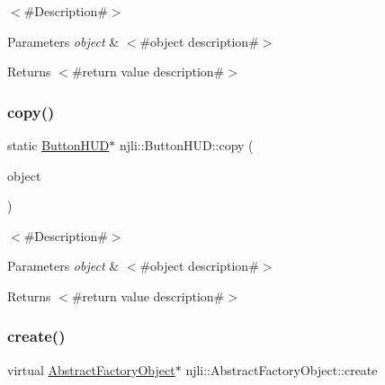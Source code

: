 $<$\#\+Description\#$>$


\begin{DoxyParams}{Parameters}
{\em object} & $<$\#object description\#$>$\\
\hline
\end{DoxyParams}
\begin{DoxyReturn}{Returns}
$<$\#return value description\#$>$ 
\end{DoxyReturn}
\mbox{\label{classnjli_1_1_button_h_u_d_ab4f81ff5e8720b507354e5d9254e1ddf}} 
\subsubsection{\texorpdfstring{copy()}{copy()}}
{\footnotesize\ttfamily static \mbox{\hyperlink{classnjli_1_1_button_h_u_d}{Button\+H\+UD}}$\ast$ njli\+::\+Button\+H\+U\+D\+::copy (\begin{DoxyParamCaption}\item[{const \mbox{\hyperlink{classnjli_1_1_button_h_u_d}{Button\+H\+UD}} \&}]{object }\end{DoxyParamCaption})\hspace{0.3cm}{\ttfamily [static]}}

$<$\#\+Description\#$>$


\begin{DoxyParams}{Parameters}
{\em object} & $<$\#object description\#$>$\\
\hline
\end{DoxyParams}
\begin{DoxyReturn}{Returns}
$<$\#return value description\#$>$ 
\end{DoxyReturn}
\mbox{\label{classnjli_1_1_button_h_u_d_a83a8876ae63b92804004cf3febe76573}} 
\subsubsection{\texorpdfstring{create()}{create()}\hspace{0.1cm}{\footnotesize\ttfamily [1/3]}}
{\footnotesize\ttfamily virtual \mbox{\hyperlink{classnjli_1_1_abstract_factory_object}{Abstract\+Factory\+Object}}$\ast$ njli\+::\+Abstract\+Factory\+Object\+::create}

